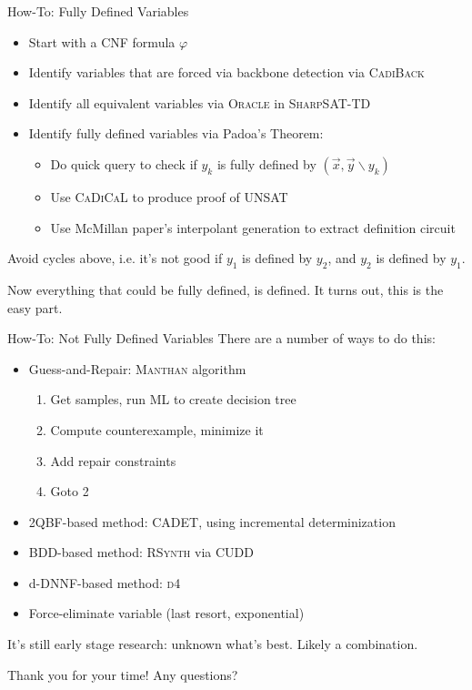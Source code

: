 \documentclass[aspectratio=169]{beamer}
\begin{document}
\begin{frame}{How-To: Fully Defined Variables}
\begin{itemize}
    \item Start with a CNF formula $ \varphi$
    \item Identify variables that are forced via backbone detection
        via \textsc{CadiBack}
    \item Identify all equivalent variables via \textsc{Oracle}
        in \textsc{SharpSAT-TD}
    \item Identify fully defined variables via Padoa's Theorem:
        \begin{itemize}
        \item Do quick query to check if $y_k$ is fully defined by $(\vec{x}, \vec{y} \backslash y_k)$
        \item Use \textsc{CaDiCaL} to produce proof of UNSAT
        \item Use McMillan paper's interpolant generation to extract definition
            circuit
        \end{itemize}
\end{itemize}
\bigskip
Avoid cycles above, i.e. it's not good if $y_1$ is defined by $y_2$, and $y_2$
is defined by $y_1$.
\bigskip

Now everything that could be fully defined, is defined. It turns out, this is
the easy part.
\end{frame}


\begin{frame}{How-To: Not Fully Defined Variables}
There are a number of ways to do this:
\begin{itemize}
    \item Guess-and-Repair: \textsc{Manthan} algorithm
        \begin{enumerate}
            \item Get samples, run ML to create decision tree
            \item Compute counterexample, minimize it
            \item Add repair constraints
            \item Goto 2
        \end{enumerate}
    \item 2QBF-based method: \textsc{CADET}, using incremental determinization
    \item BDD-based method: \textsc{RSynth} via \textsc{CUDD}
    \item d-DNNF-based method: \textsc{d4}
    \item Force-eliminate variable (last resort, exponential)
\end{itemize}
\bigskip

It's still early stage research: unknown what's best. Likely a combination.
\end{frame}

\begin{frame}{Thank you for your time!}
    Any questions?
\end{frame}
\end{document}
